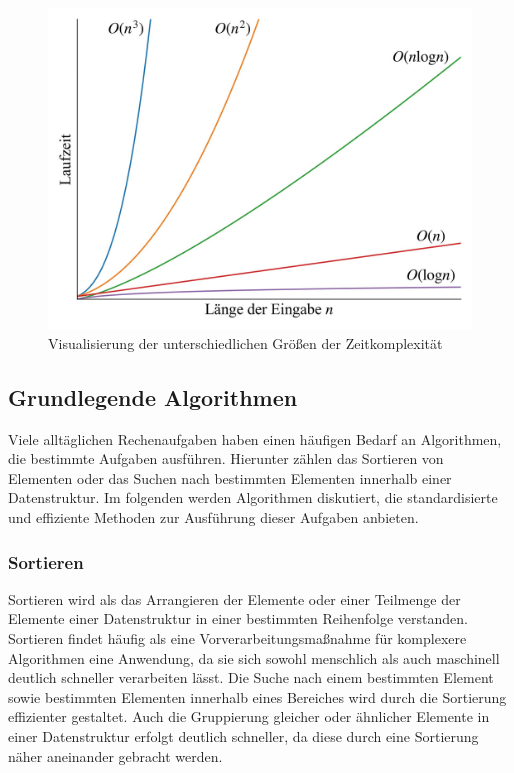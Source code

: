 \begin{figure}[!b]
	\includegraphics[scale=0.17]{Abbildungen/Time_complexities.jpg}
	\centering
	\caption[Zeitkomplexität von Algorithmen]{Visualisierung der unterschiedlichen Größen der Zeitkomplexität}
	\label{fig: time_complexity}
\end{figure}

\subsection{Grundlegende Algorithmen}
Viele alltäglichen Rechenaufgaben haben einen häufigen Bedarf an Algorithmen, die bestimmte Aufgaben ausführen. Hierunter zählen das Sortieren von Elementen oder das Suchen nach bestimmten Elementen innerhalb einer Datenstruktur. Im folgenden werden Algorithmen diskutiert, die standardisierte und effiziente Methoden zur Ausführung dieser Aufgaben anbieten.

\subsubsection{Sortieren}
Sortieren wird als das Arrangieren der Elemente oder einer Teilmenge der Elemente einer Datenstruktur in einer bestimmten Reihenfolge verstanden. Sortieren findet häufig als eine Vorverarbeitungsmaßnahme für komplexere Algorithmen eine Anwendung, da sie sich sowohl menschlich als auch maschinell deutlich schneller verarbeiten lässt. Die Suche nach einem bestimmten Element sowie bestimmten Elementen innerhalb eines Bereiches wird durch die Sortierung effizienter gestaltet. Auch die Gruppierung gleicher oder ähnlicher Elemente in einer Datenstruktur erfolgt deutlich schneller, da diese durch eine Sortierung näher aneinander gebracht werden. \autocite[153-154]{sanders_sequential_2019}

